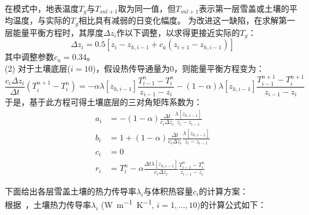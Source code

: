 在模式中，地表温度$T_g$与$T_{snl+1}$取为同一值，但$T_{snl+1}$表示第一层雪盖或土壤的平均温度，与实际的$T_g$相比具有减弱的日变化幅度。
为改进这一缺陷，在求解第一层能量平衡方程时，其厚度$\Delta z_i$作以下调整，以求得更接近实际的$T_g$：
\begin{equation}
\Delta z_{i}=0.5\left[z_{i}-z_{h, i-1}+c_{a}\left(z_{i+1}-z_{h, i-1}\right)\right]
\end{equation}
其中调整参数$c_a=0.34$。\\
(2) 对于土壤底层($i=10$)，假设热传导通量为0，则能量平衡方程变为：
\begin{equation}
\frac{c_{i} \Delta z_{i}}{\Delta t}\left(T_{i}^{n+1}-T_{i}^{n}\right)=-\alpha \lambda\left[z_{h, i-1}\right] \frac{T_{i-1}^{n}-T_{i}^{n}}{z_{i-1}-z_{i}}-(1-\alpha) \lambda\left[z_{h, i-1}\right] \frac{T_{i-1}^{n+1}-T_{i}^{n+1}}{z_{i-1}-z_{i}}
\end{equation}
于是，基于此方程可得土壤底层的三对角矩阵系数为：
\begin{equation}
\begin{aligned}
a_{i} &= -(1-\alpha) \frac{\Delta t}{c_{i} \Delta z_{i}} \frac{\lambda\left[z_{h, i-1}\right]}{z_{i}-z_{i-1}} \\
b_{i} &= 1+(1-\alpha) \frac{\Delta t}{c_{i} \Delta z_{i}} \frac{\lambda\left[z_{h, i-1}\right]}{z_{i}-z_{i-1}} \\
c_{i} &= 0 \\
r_{i} &= T_{i}^{n}-\alpha \frac{\Delta t \lambda\left[z_{h, i-1}\right]}{c_{i} \Delta z_{i}} \frac{T_{i-1}^{n}-T_{i}^{n}}{z_{i-1}-z_{i}}
\end{aligned}
\end{equation}

下面给出各层雪盖土壤的热力传导率$\lambda_i$与体积热容量$c_i$的计算方案：\\

根据~\citet{farouki1981thermal}，土壤热力传导率$\lambda_i$ (\unit{W.m^{-1}.K^{-1}}, $i=1,\ldots,10$)的计算公式如下：

